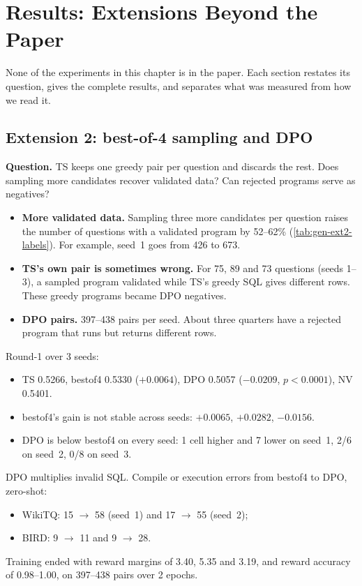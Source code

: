 \chapter{Results: Extensions Beyond the Paper}\label{ch:results-ext}

None of the experiments in this chapter is in the paper. Each section restates its question, gives the complete
results, and separates what was measured from how we read it.

\section{Extension 2: best-of-4 sampling and DPO}\label{sec:ext2}

\textbf{Question.} TS keeps one greedy pair per question and discards the rest. Does sampling more candidates recover
validated data? Can rejected programs serve as negatives?



\begin{observation}
\begin{itemize}
\item \textbf{More validated data.} Sampling three more candidates per question raises the number of questions with a
validated program by 52--62\% (\cref{tab:gen-ext2-labels}). For example, seed~1 goes from 426 to 673.
\item \textbf{TS's own pair is sometimes wrong.} For 75, 89 and 73 questions (seeds 1--3), a sampled program
validated while TS's greedy SQL gives different rows. These greedy programs became DPO negatives.
\item \textbf{DPO pairs.} 397--438 pairs per seed. About three quarters have a rejected program that runs but returns
different rows.
\end{itemize}
\end{observation}



\begin{observation}
Round-1 \Mviii{} over 3 seeds:
\begin{itemize}
\item TS 0.5266, bestof4 0.5330 ($+0.0064$), DPO 0.5057 ($-0.0209$, $p<0.0001$), NV 0.5401.
\item bestof4's gain is not stable across seeds: $+0.0065$, $+0.0282$, $-0.0156$.
\item DPO is below bestof4 on every seed: 1 cell higher and 7 lower on seed~1, 2/6 on seed~2, 0/8 on seed~3.
\end{itemize}
DPO multiplies invalid SQL. Compile or execution errors from bestof4 to DPO, zero-shot:
\begin{itemize}
\item WikiTQ: 15 $\to$ 58 (seed~1) and 17 $\to$ 55 (seed~2);
\item BIRD: 9 $\to$ 11 and 9 $\to$ 28.
\end{itemize}
Training ended with reward margins of 3.40, 5.35 and 3.19, and reward accuracy of 0.98--1.00, on 397--438 pairs over 2
epochs.
\end{observation}

